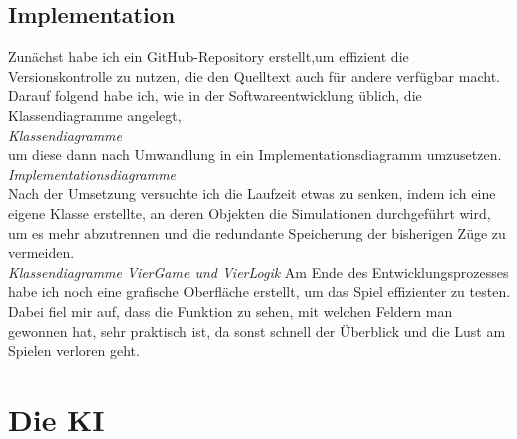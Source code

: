 \documentclass[12pt,a4paper,ngerman]{article}
\begin{document}
	\subsection{Implementation}
	Zunächst habe ich ein GitHub-Repository erstellt,um effizient die Versionskontrolle zu nutzen, die den Quelltext auch für andere verfügbar macht.
	Darauf folgend habe ich, wie in der Softwareentwicklung üblich, die Klassendiagramme angelegt,\\
	\textit{Klassendiagramme}\\
	 um diese dann nach Umwandlung in ein Implementationsdiagramm umzusetzen.\\
	\textit{Implementationsdiagramme}\\
	Nach der Umsetzung versuchte ich die Laufzeit etwas zu senken, indem ich eine eigene Klasse erstellte, an deren Objekten die Simulationen durchgeführt wird, um es mehr abzutrennen und die redundante Speicherung der bisherigen Züge zu vermeiden.\\
	\textit{Klassendiagramme VierGame und VierLogik}
	Am Ende des Entwicklungsprozesses habe ich noch eine grafische Oberfläche erstellt, um das Spiel effizienter zu testen. Dabei fiel mir auf, dass die Funktion zu sehen, mit welchen Feldern man gewonnen hat, sehr praktisch ist, da sonst schnell der Überblick und die Lust am Spielen verloren geht.
	\section{Die KI}
\end{document}
